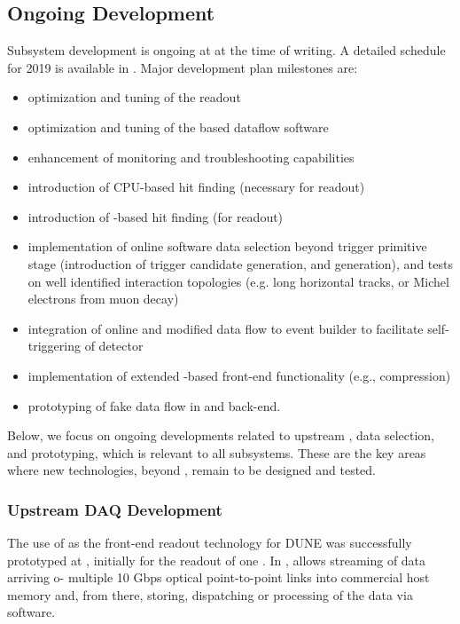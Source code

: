 \subsection{Ongoing Development}
\label{sec:sp-daq:design-validation}

Subsystem development is ongoing at  at the time of
writing. A detailed schedule for 2019 is available
in \cite{bib:docdb14095}. Major development plan milestones are:
\begin{itemize}
\item optimization and tuning of the  readout
\item optimization and tuning of the  based dataflow software
\item enhancement of monitoring and troubleshooting capabilities
\item introduction of CPU-based hit finding (necessary for  readout)
\item introduction of -based hit finding (for  readout)
\item implementation of online software data selection beyond trigger
primitive stage (introduction of trigger candidate generation, and
 generation), and tests on well identified interaction
topologies (e.g. long horizontal tracks, or Michel electrons from muon decay)
\item integration of online  and modified data flow to event
builder to facilitate self-triggering of detector
\item implementation of extended -based front-end functionality
(e.g., compression)
\item prototyping of fake  data flow in  and back-end.
\end{itemize}

Below, we focus on ongoing developments related to upstream ,
data selection, and  prototyping, which is relevant to all  subsystems. These are the key areas where new technologies, beyond , remain to be designed and tested.


\subsubsection{Upstream DAQ Development}

The use of  as the front-end readout technology for DUNE was
successfully prototyped at , initially for the readout of one
. In ,  allows streaming of data arriving o- multiple 10
Gbps optical point-to-point links into commercial host memory and,
from there, storing, dispatching or processing of the data via
software. 

